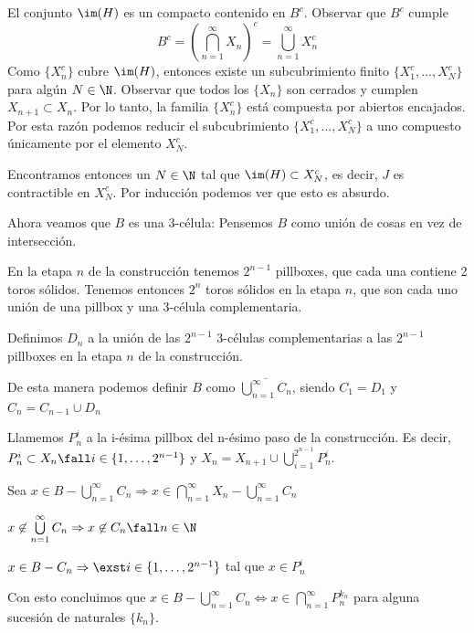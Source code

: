 El conjunto $\im(H)$ es un compacto contenido en $B^c$. Observar que $B^c$ cumple $$B^c=\left(\bigcap\limits_{n=1}^\infty X_n\right)^c=\bigcup\limits_{n=1}^\infty X_n^c$$ 
Como $\{X_n^c\}$ cubre $\im(H)$, entonces existe un subcubrimiento finito $\{X_1^c,\dots, X_N^c\}$ para algún $N\in\N$. Observar que todos los $\{X_n\}$ son cerrados y cumplen $X_{n+1}\subset X_n$. Por lo tanto, la familia $\{X_n^c\}$ está compuesta por abiertos encajados. Por esta razón podemos reducir el subcubrimiento $\{X_1^c,\dots, X_N^c\}$ a uno compuesto únicamente por el elemento $X_N^c$. 

Encontramos entonces un $N\in\N$ tal que $\im(H)\subset X_N^c$, es decir, $J$ es contractible en $X_N^c$. Por inducción podemos ver que esto es absurdo. 

Ahora veamos que $B$ es una 3-célula: Pensemos $B$ como unión de cosas en vez de intersección. 

En la etapa $n$ de la construcción tenemos $2^{n-1}$ pillboxes, que cada una contiene 2 toros sólidos. Tenemos entonces $2^n$ toros sólidos en la etapa $n$, que son cada uno unión de una pillbox y una 3-célula complementaria. 

Definimos $D_n$ a la unión de las $2^{n-1}$ 3-células complementarias a las $2^{n-1}$ pillboxes en la etapa $n$ de la construcción. 

De esta manera podemos definir $B$ como $\overline{\bigcup\limits_{n=1}^\infty C_n}$, siendo $C_1=D_1$ y $C_n=C_{n-1}\cup D_n$ 
            

Llamemos $P_n^i$ a la i-ésima pillbox del n-ésimo paso de la construcción. Es decir, $P_n^i\subset X_n \fall i\in\{1,\dots,2^{n-1}\}$ y $X_n=X_{n+1}\cup\bigcup\limits_{i=1}^{2^{n-1}}P_n^i$. 
            
Sea $x\in B-\bigcup\limits_{n=1}^\infty C_n \Rightarrow x\in \bigcap\limits_{n=1}^\infty X_n-\bigcup\limits_{n=1}^\infty C_n$ 

$x\not\in\bigcup\limits_{n=1}^\infty C_n \Rightarrow x\not\in C_n\fall n\in\N$ 

$x\in B-C_n\Rightarrow \exst i\in\{1,\dots,2^{n-1}\}$ tal que $x\in P_n^i$ 

Con esto concluimos que $x\in B-\bigcup\limits_{n=1}^\infty C_n \Leftrightarrow x\in\bigcap\limits_{n=1}^\infty P_n^{k_n}$ para alguna sucesión de naturales $\{k_n\}$. 

